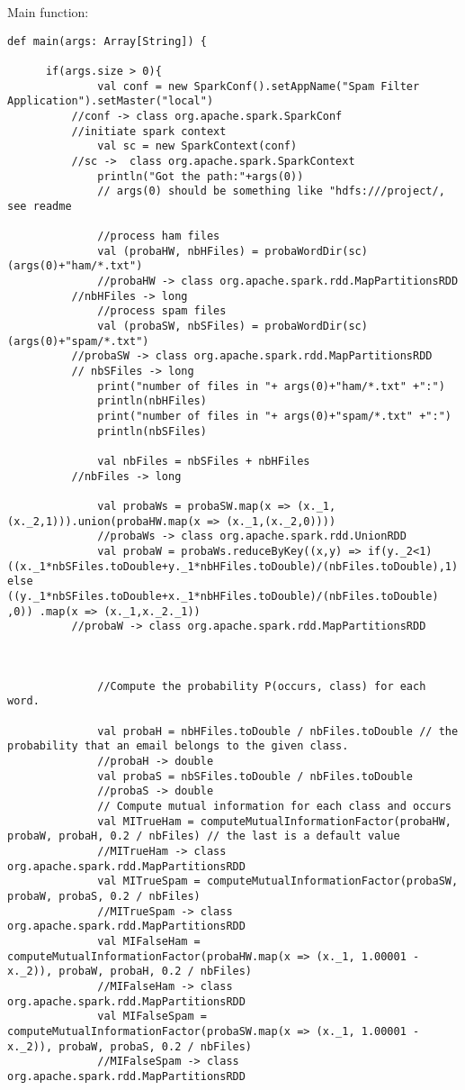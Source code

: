 \documentclass[paper=a4, fontsize=11pt]{scrartcl}
\numberwithin{equation}{section}		%
\numberwithin{figure}{section}			%
\numberwithin{table}{section}				%
\begin{document}
Main function:
\begin{lstlisting}
def main(args: Array[String]) {

      if(args.size > 0){
              val conf = new SparkConf().setAppName("Spam Filter Application").setMaster("local")
	      //conf -> class org.apache.spark.SparkConf
	      //initiate spark context
              val sc = new SparkContext(conf)
	      //sc ->  class org.apache.spark.SparkContext
              println("Got the path:"+args(0))
              // args(0) should be something like "hdfs:///project/, see readme

              //process ham files
              val (probaHW, nbHFiles) = probaWordDir(sc)(args(0)+"ham/*.txt")
              //probaHW -> class org.apache.spark.rdd.MapPartitionsRDD
	      //nbHFiles -> long
              //process spam files
              val (probaSW, nbSFiles) = probaWordDir(sc)(args(0)+"spam/*.txt")
	      //probaSW -> class org.apache.spark.rdd.MapPartitionsRDD
	      // nbSFiles -> long
              print("number of files in "+ args(0)+"ham/*.txt" +":")
              println(nbHFiles)
              print("number of files in "+ args(0)+"spam/*.txt" +":")
              println(nbSFiles)

              val nbFiles = nbSFiles + nbHFiles
	      //nbFiles -> long
             
              val probaWs = probaSW.map(x => (x._1,(x._2,1))).union(probaHW.map(x => (x._1,(x._2,0))))
              //probaWs -> class org.apache.spark.rdd.UnionRDD
              val probaW = probaWs.reduceByKey((x,y) => if(y._2<1) ((x._1*nbSFiles.toDouble+y._1*nbHFiles.toDouble)/(nbFiles.toDouble),1) else ((y._1*nbSFiles.toDouble+x._1*nbHFiles.toDouble)/(nbFiles.toDouble) ,0)) .map(x => (x._1,x._2._1))
 	      //probaW -> class org.apache.spark.rdd.MapPartitionsRDD



              //Compute the probability P(occurs, class) for each word.

              val probaH = nbHFiles.toDouble / nbFiles.toDouble // the probability that an email belongs to the given class.
              //probaH -> double
              val probaS = nbSFiles.toDouble / nbFiles.toDouble
              //probaS -> double
              // Compute mutual information for each class and occurs
              val MITrueHam = computeMutualInformationFactor(probaHW, probaW, probaH, 0.2 / nbFiles) // the last is a default value
              //MITrueHam -> class org.apache.spark.rdd.MapPartitionsRDD
              val MITrueSpam = computeMutualInformationFactor(probaSW, probaW, probaS, 0.2 / nbFiles)
              //MITrueSpam -> class org.apache.spark.rdd.MapPartitionsRDD
              val MIFalseHam = computeMutualInformationFactor(probaHW.map(x => (x._1, 1.00001 - x._2)), probaW, probaH, 0.2 / nbFiles)
              //MIFalseHam -> class org.apache.spark.rdd.MapPartitionsRDD
              val MIFalseSpam = computeMutualInformationFactor(probaSW.map(x => (x._1, 1.00001 - x._2)), probaW, probaS, 0.2 / nbFiles)
              //MIFalseSpam -> class org.apache.spark.rdd.MapPartitionsRDD



\end{lstlisting}
\end{document}
